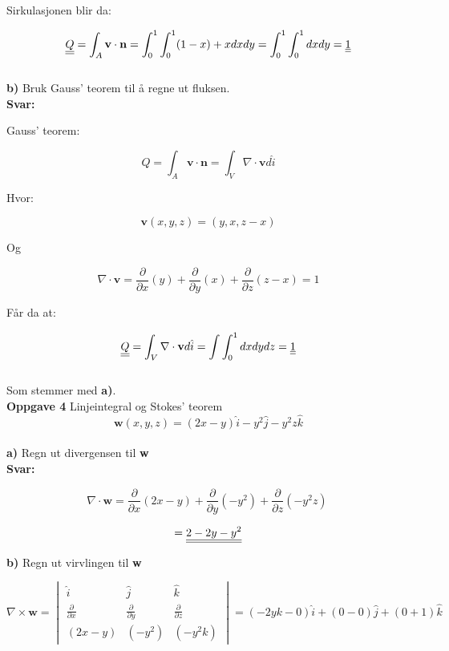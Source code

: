 \documentclass[a4paper,norsk,12pt]{article}
\begin{document}
Sirkulasjonen blir da:

$$ 
\def\doubleunderline#1{\underline{\underline{#1}}}
\doubleunderline{Q} = \int_A \textbf{v} \cdot \textbf{n} = \int_0^1 \int_0^1 (1-x) + x dx dy = \int_0^1 \int_0^1 dx dy =  \doubleunderline{1} 
$$\\


\textbf{b)} Bruk Gauss' teorem til å regne ut fluksen.\\

\textbf{Svar:}

Gauss' teorem:

$$
Q  = \int_A \textbf{v} \cdot \textbf{n} = \int_V \nabla \cdot \textbf{v} d \hat i 
$$

Hvor:

$$ \textbf{v}(x,y,z) = (y, x, z-x) $$

Og

$$
\nabla \cdot \textbf{v} = \frac{\partial}{\partial x} (y)+ \frac{\partial}{\partial y} (x) + \frac{\partial}{\partial z} (z-x) = 1
$$

Får da at:

$$
\def\doubleunderline#1{\underline{\underline{#1}}}
\doubleunderline{Q}  = \int_V \nabla \cdot \textbf{v} d \hat i = \int \int_0^1 dx dy dz = \doubleunderline{1}
$$\\

Som stemmer med \textbf{a)}.\\

\textbf{Oppgave 4} \hspace{3mm} Linjeintegral og Stokes' teorem\\

$$ \textbf{w} (x,y,z) = (2x - y) \hat i -y^2 \hat j - y^2 z \hat k $$
\\
\textbf{a)} Regn ut divergensen til \textbf{w}
\\

\textbf{Svar:}

$$
\nabla \cdot \textbf{w} = \frac{\partial}{\partial x} (2x-y) + \frac{\partial}{\partial y} (-y^2)+ \frac{\partial}{\partial z} (-y^2 z) \ 
$$

$$
\def\doubleunderline#1{\underline{\underline{#1}}}
= \doubleunderline{2 - 2y - y^2}
$$

\textbf{b)} Regn ut virvlingen til \textbf{w}


$$
\nabla \times \textbf{w}
=\begin{vmatrix}
\hat i & \hat j & \hat k \\
\frac{\partial}{\partial x} & \frac{\partial}{\partial y} & \frac{\partial}{\partial z} \\
(2x-y) & (-y^2) & (-y^2 k)
\end{vmatrix}
= (-2 y k - 0) \hat i + (0 - 0) \hat j + (0+1) \hat k
$$
\end{document}
